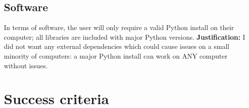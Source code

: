 \subsection{Software}

In terms of software, the user will only require a valid Python install on their computer; all libraries are included with major Python versions. \newline \textbf{Justification:} I did not want any external dependencies which could cause issues on a small minority of computers: a major Python install can work on ANY computer without issues.

\newpage
\section{Success criteria}

